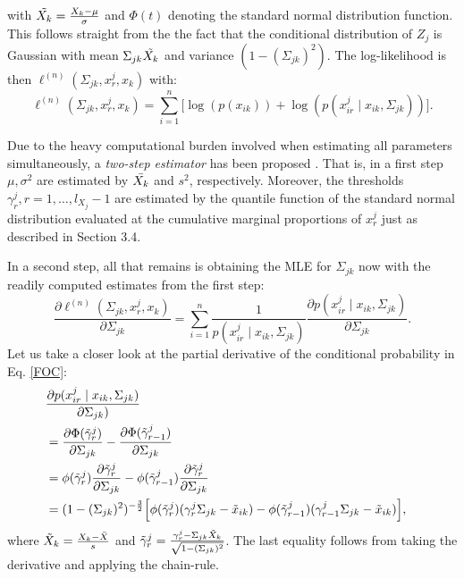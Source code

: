 with $\Tilde{X_k} = \frac{X_k-\mu}{\sigma}$ and $\Phi(t)$ denoting the standard normal distribution function. This follows straight from the the fact that the conditional distribution of $Z_j$ is Gaussian with mean $\Sigma_{jk}\Tilde{X_k}$ and variance $(1-(\Sigma_{jk})^2)$. The log-likelihood is then $\ell^{(n)}(\Sigma_{jk}, x^j_r,x_k)$ with:
\begin{equation}\label{polyserial_loglikelihood}
    \ell^{(n)}(\Sigma_{jk}, x^j_r,x_k) = \sum_{i=1}^n \big[\log(p(x_{ik})) + \log(p(x^j_{ir} \mid x_{ik}, \Sigma_{jk}))\big].
\end{equation}

Due to the heavy computational burden involved when estimating all parameters simultaneously, a \textit{two-step estimator} has been proposed \citet{Olsson82}. That is, in a first step $\mu, \sigma^2$ are estimated by $\Bar{X_k}$ and $s^2$, respectively. Moreover, the thresholds $\gamma^j_r, r = 1, \dots, l_{X_j}-1$ are estimated by the quantile function of the standard normal distribution evaluated at the cumulative marginal proportions of $x^j_r$ just as described in Section 3.4. %

In a second step, all that remains is obtaining the MLE for $\Sigma_{jk}$ now with the readily computed estimates from the first step:
\begin{equation}\label{FOC}
    \frac{\partial\ell^{(n)}(\Sigma_{jk}, x^j_r,x_k)}{\partial \Sigma_{jk}} = \sum_{i=1}^n \frac{1}{p(x^j_{ir} \mid x_{ik}, \Sigma_{jk})} \frac{\partial p(x^j_{ir} \mid x_{ik}, \Sigma_{jk})}{\partial \Sigma_{jk}}.
\end{equation}
Let us take a closer look at the partial derivative of the conditional probability in Eq. \eqref{FOC}:
\begin{equation}\label{case2_firstdiff}
    \begin{split}
        \lefteqn{\frac{\partial p(x^j_{ir} \mid x_{ik}, \Sigma_{jk})}{\partial \Sigma_{jk})}} \\
        &= \frac{\partial \Phi({\Tilde{\gamma}}^j_{r})}{\partial \Sigma_{jk}} - \frac{\partial\Phi({\Tilde{\gamma}}^j_{r-1})}{\partial \Sigma_{jk}} \\
        &= \phi({\Tilde{\gamma}}^j_{r})\frac{\partial {\Tilde{\gamma}}^j_{r}}{\partial\Sigma_{jk}} - \phi({\Tilde{\gamma}}^j_{r-1})\frac{\partial {\Tilde{\gamma}}^j_{r}}{\partial\Sigma_{jk}} \\
        &= (1-(\Sigma_{jk})^2)^{-\frac{3}{2}}\Big[\phi({\Tilde{\gamma}}^j_{r})({\gamma}^j_r\Sigma_{jk} - {\Tilde{x}}_{ik}) - \phi({\Tilde{\gamma}}^j_{r-1})({\gamma}^j_{r-1}\Sigma_{jk} - {\Tilde{x}}_{ik})\Big],
    \end{split}
\end{equation}
where ${\Tilde{X}}_{k} = \frac{X_{k} - \Bar{X}}{s}$ and ${\Tilde{\gamma}}^j_{r} = \frac{{\gamma}^j_{r} - \Sigma_{jk}{\Tilde{X}}_k}{\sqrt{1-(\Sigma_{jk})^2}}$. The last equality follows from taking the derivative and applying the chain-rule.  

